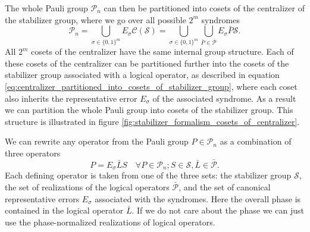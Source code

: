 The whole Pauli group $\mathcal{P}_n$ can then be partitioned into cosets of the centralizer of the stabilizer group, where we go over all possible $2^m$ syndromes
\begin{equation}
    \mathcal{P}_n = \bigcup_{\sigma \in \{0,1\}^m} E_{\sigma} \mathcal{C}(\mathcal{S})= \bigcup_{\sigma \in \{0,1\}^m} \bigcup_{\bar{P} \in\bar{\mathcal{P}}} E_{\sigma} \bar{P} \mathcal{S}.
\end{equation}
All $2^m$ cosets of the centralizer have the same internal group structure.
Each of these cosets of the centralizer can be partitioned further into the cosets of the stabilizer group associated with a logical operator, 
as described in equation \eqref{eq:centralizer_partitioned_into_cosets_of_stabilizer_group},
where each coset also inherits the representative error $E_\sigma$ of the associated syndrome.
As a result we can partition the whole Pauli group into cosets of the stabilizer group.
This structure is illustrated in figure \ref{fig:stabilizer_formalism_cosets_of_centralizer}.

We can rewrite any operator from the Pauli group $P \in \mathcal{P}_n$ as a combination of three operators
\begin{equation}
    P =  E_\sigma \bar{L} S \quad \forall P \in \mathcal{P}_n; S \in \mathcal{S}, \bar{L} \in \bar{\mathcal{P}}.
    \label{eq:pauli_rewriting_stabilizer_formalism}
\end{equation}
Each defining operator is taken from one of the three sets: the stabilizer group $\mathcal{S}$,
the set of realizations of the logical operators $\bar{\mathcal{P}}$, and the set of canonical
representative errors $E_\sigma$ associated with the syndromes.
Here the overall phase is contained in the logical operator $\bar{L}$.
If we do not care about the phase we can just use the phase-normalized realizations of logical operators.

